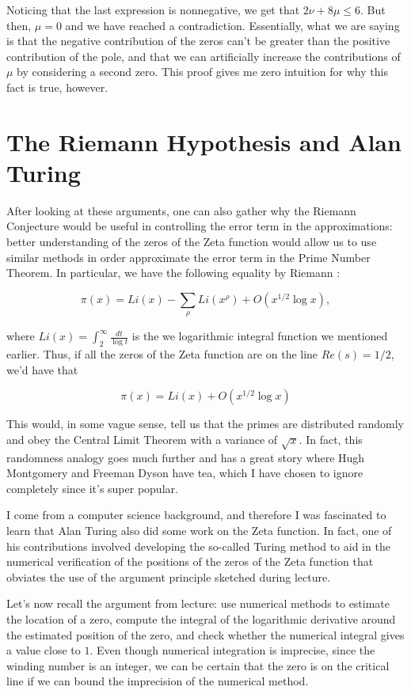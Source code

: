 \documentclass{article}
\theoremstyle{definition}
\begin{document}
Noticing that the last expression is nonnegative, we get that $ 2 \nu + 8 \mu \leq 6 $.
But then, $ \mu = 0 $ and we have reached a contradiction.
Essentially, what we are saying is that the negative contribution of the zeros can't be greater
than the positive contribution of the pole, and that we can artificially increase
the contributions of $ \mu $ by considering a second zero. 
This proof gives me zero intuition for why this fact is true, however.

\section{The Riemann Hypothesis and Alan Turing}

After looking at these arguments, one can also gather why the Riemann Conjecture would
be useful in controlling the error term in the approximations: better understanding
of the zeros of the Zeta function would allow us to use similar methods in order approximate
the error term in the Prime Number Theorem. In particular, we have the following equality by 
Riemann \cite{princetonacademics_andrew_2012}:

\[ \pi(x) = Li(x) - \sum_{\rho} Li(x^{\rho}) + O(x^{1/2} \log x),\]

where $ Li(x) = \int_{2}^{\infty} \frac{dt}{\log t} $ is the we logarithmic integral function we mentioned earlier.
Thus, if all the zeros of the Zeta function are on the line $ Re(s) = 1/2 $,
we'd have that

\[ \pi(x) = Li(x) + O(x^{1/2} \log x) \]

This would, in some vague sense, tell us that the primes are distributed randomly and obey
the Central Limit Theorem with a variance of $ \sqrt{x} $. In fact, this randomness analogy goes much further and has a great story
where Hugh Montgomery and Freeman Dyson have tea, which I have chosen to ignore
completely since it's super popular.

I come from a computer science background, and therefore I was fascinated to learn
that Alan Turing also did some work on the Zeta function. In fact, one of
his contributions involved developing the so-called Turing method to aid in the
numerical verification of the positions of the zeros of the Zeta function
that obviates the use of the argument principle sketched during lecture.

Let's now recall the argument from lecture: use numerical methods to estimate the location
of a zero, compute the integral of the logarithmic derivative around the estimated position of the zero, 
and check whether the numerical integral gives a value close to $ 1 $. Even though numerical integration is imprecise,
since the winding number is an integer, we can be certain that the zero is on
the critical line if we can bound the imprecision of the numerical method.
\end{document}
